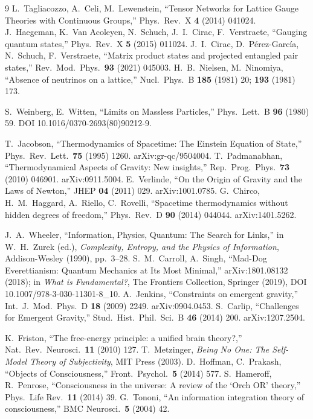 \documentclass[12pt,a4paper,twoside]{article}
\theoremstyle{plain}
\theoremstyle{definition}
\theoremstyle{remark}
\begin{document}
\begin{thebibliography}{9}
L.~Tagliacozzo, A.~Celi, M.~Lewenstein, ``Tensor Networks for Lattice Gauge Theories with Continuous Groups,'' Phys.\ Rev.\ X \textbf{4} (2014) 041024.
J.~Haegeman, K.~Van Acoleyen, N.~Schuch, J.~I.~Cirac, F.~Verstraete, ``Gauging quantum states,'' Phys.\ Rev.\ X \textbf{5} (2015) 011024.
J.~I.~Cirac, D.~P\'erez-Garc\'ia, N.~Schuch, F.~Verstraete, ``Matrix product states and projected entangled pair states,'' Rev.\ Mod.\ Phys.\ \textbf{93} (2021) 045003.
H.~B.~Nielsen, M.~Ninomiya, ``Absence of neutrinos on a lattice,'' Nucl.\ Phys.\ B \textbf{185} (1981) 20; \textbf{193} (1981) 173.

S.~Weinberg, E.~Witten, ``Limits on Massless Particles,'' Phys.\ Lett.\ B \textbf{96} (1980) 59. DOI 10.1016/0370-2693(80)90212-9.

T.~Jacobson, ``Thermodynamics of Spacetime: The Einstein Equation of State,'' Phys.\ Rev.\ Lett.\ \textbf{75} (1995) 1260. arXiv:gr-qc/9504004.
T.~Padmanabhan, ``Thermodynamical Aspects of Gravity: New insights,'' Rep.\ Prog.\ Phys.\ \textbf{73} (2010) 046901. arXiv:0911.5004.
E.~Verlinde, ``On the Origin of Gravity and the Laws of Newton,'' JHEP \textbf{04} (2011) 029. arXiv:1001.0785.
G.~Chirco, H.~M.~Haggard, A.~Riello, C.~Rovelli, ``Spacetime thermodynamics without hidden degrees of freedom,'' Phys.\ Rev.\ D \textbf{90} (2014) 044044. arXiv:1401.5262.

J.~A.~Wheeler, ``Information, Physics, Quantum: The Search for Links,'' in W.~H.~Zurek (ed.), \emph{Complexity, Entropy, and the Physics of Information}, Addison-Wesley (1990), pp.~3--28.
S.~M.~Carroll, A.~Singh, ``Mad-Dog Everettianism: Quantum Mechanics at Its Most Minimal,'' arXiv:1801.08132 (2018); in \emph{What is Fundamental?}, The Frontiers Collection, Springer (2019), DOI 10.1007/978-3-030-11301-8\_10.
A.~Jenkins, ``Constraints on emergent gravity,'' Int.\ J.\ Mod.\ Phys.\ D \textbf{18} (2009) 2249. arXiv:0904.0453.
S.~Carlip, ``Challenges for Emergent Gravity,'' Stud.\ Hist.\ Phil.\ Sci.\ B \textbf{46} (2014) 200. arXiv:1207.2504.

K.~Friston, ``The free-energy principle: a unified brain theory?,'' Nat.\ Rev.\ Neurosci.\ \textbf{11} (2010) 127.
T.~Metzinger, \textit{Being No One: The Self-Model Theory of Subjectivity}, MIT Press (2003).
D.~Hoffman, C.~Prakash, ``Objects of Consciousness,'' Front.\ Psychol.\ \textbf{5} (2014) 577.
S.~Hameroff, R.~Penrose, ``Consciousness in the universe: A review of the `Orch OR' theory,'' Phys.\ Life Rev.\ \textbf{11} (2014) 39.
G.~Tononi, ``An information integration theory of consciousness,'' BMC Neurosci.\ \textbf{5} (2004) 42.


\end{thebibliography}
\end{document}
